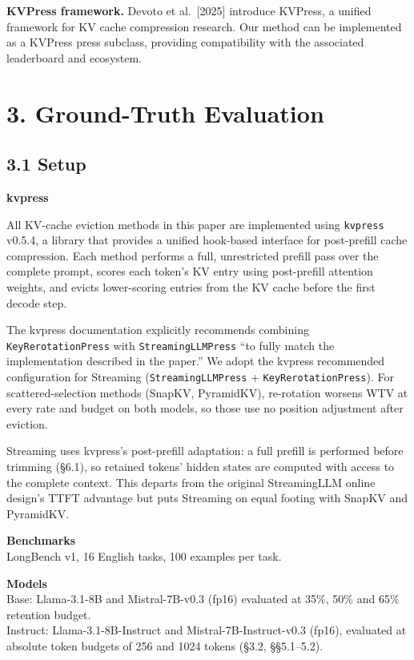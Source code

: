 \documentclass[10pt,letterpaper]{article}
\begin{document}
\textbf{KVPress framework.} Devoto et al.~{[}2025{]} introduce KVPress,
a unified framework for KV cache compression research. Our method can be
implemented as a KVPress press subclass, providing compatibility with
the associated leaderboard and ecosystem.


\hypertarget{ground-truth-evaluation}{%
\section{3. Ground-Truth Evaluation}\label{ground-truth-evaluation}}

\hypertarget{setup-1}{%
\subsection{3.1 Setup}\label{setup-1}}

\textbf{kvpress}

All KV-cache eviction methods in this paper are implemented using
\texttt{kvpress} v0.5.4, a library that provides a unified hook-based
interface for post-prefill cache compression. Each method performs a
full, unrestricted prefill pass over the complete prompt, scores each
token's KV entry using post-prefill attention weights, and evicts
lower-scoring entries from the KV cache before the first decode step.

The kvpress documentation explicitly recommends combining
\texttt{KeyRerotationPress} with \texttt{StreamingLLMPress} ``to fully
match the implementation described in the paper.'' We adopt the kvpress
recommended configuration for Streaming (\texttt{StreamingLLMPress} +
\texttt{KeyRerotationPress}). For scattered-selection methods (SnapKV,
PyramidKV), re-rotation worsens WTV at every rate and budget on
both models, so those use no position adjustment after eviction.

Streaming uses kvpress's post-prefill adaptation: a full prefill is
performed before trimming (§6.1), so retained tokens' hidden states are
computed with access to the complete context. This departs from the
original StreamingLLM online design's TTFT advantage but puts Streaming
on equal footing with SnapKV and PyramidKV.

\textbf{Benchmarks}
\\LongBench v1, 16 English tasks, 100 examples per task.

\textbf{Models}
\\Base: Llama-3.1-8B and Mistral-7B-v0.3 (fp16) evaluated at 35\%, 50\% and 65\% retention budget.
\\Instruct: Llama-3.1-8B-Instruct and Mistral-7B-Instruct-v0.3 (fp16), evaluated at absolute token budgets of 256 and 1024 tokens (§3.2, §§5.1--5.2).
\end{document}
